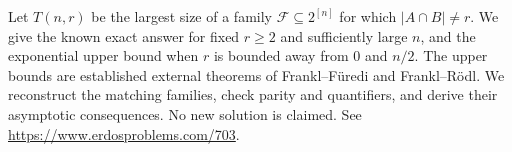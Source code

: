 Let \(T(n,r)\) be the largest size of a family
\(\mathcal F\subseteq2^{[n]}\) for which \(|A\cap B|\ne r\).
We give the known exact answer for fixed \(r\geq2\) and
sufficiently large \(n\), and the exponential upper bound
when \(r\) is bounded away from \(0\) and \(n/2\).
The upper bounds are established external theorems of
Frankl--F\"uredi and Frankl--R\"odl. We reconstruct the matching
families, check parity and quantifiers, and derive their
asymptotic consequences. No new solution is claimed.
See \url{https://www.erdosproblems.com/703}.
